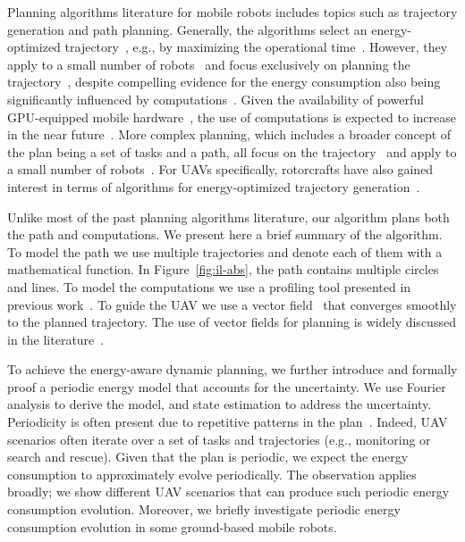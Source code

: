 \documentclass[letterpaper,10pt,conference]{ieeeconf}
\theoremstyle{definition}
\begin{document}
Planning algorithms literature for mobile robots includes topics such as trajectory generation and path planning. Generally, the algorithms select an energy-optimized trajectory~\cite{mei2004energy}, e.g., by maximizing the operational time~\cite{wahab2015energy}. However, they apply to a small number of robots~\cite{kim2005energy} and focus exclusively on planning the trajectory~\cite{kim2008minimum}, despite compelling evidence for the energy consumption also being significantly influenced by computations~\cite{mei2005case}. Given the availability of powerful GPU-equipped mobile hardware~\cite{rizvi2017general}, the use of computations is expected to increase in the near future~\cite{abramov2012real,satria2016real,jaramillo2019visual}. More complex planning, which includes a broader concept of the plan being a set of tasks and a path, all focus on the trajectory~\cite{mei2005case,mei2006deployment} and apply to a small number of robots~\cite{sadrpour2013mission,sadrpour2013experimental}. For UAVs specifically, rotorcrafts have also gained interest in terms of algorithms for energy-optimized trajectory generation~\cite{morbidi2016minimum,kreciglowa2017energy}. 

Unlike most of the past planning algorithms literature, our algorithm plans both the path and computations. We present here a brief summary of the algorithm. To model the path we use multiple trajectories and denote each of them with a mathematical function. In Figure~\ref{fig:il-abs}, the path contains multiple circles and lines. To model the computations we use a profiling tool presented in previous work~\cite{seewald2019coarse}. To guide the UAV we use a vector field~\cite{de2017guidance} that converges smoothly to the planned trajectory. The use of vector fields for planning is widely discussed in the literature~\cite{lindemann2005smoothly,gonccalves2010vector,panagou2014motion,zhou2014vector,kapitanyuk2017guiding,de2017guidance}. 

To achieve the energy-aware dynamic planning, we further introduce and formally proof a periodic energy model that accounts for the uncertainty. We use Fourier analysis to derive the model, and state estimation to address the uncertainty. Periodicity is often present due to repetitive patterns in the plan~\cite{seewald2020mechanical}. Indeed, UAV scenarios often iterate over a set of tasks and trajectories (e.g., monitoring or search and rescue). Given that the plan is periodic, we expect the energy consumption to approximately evolve periodically. The observation applies broadly; we show different UAV scenarios that can produce such periodic energy consumption evolution. Moreover, we briefly investigate periodic energy consumption evolution in some ground-based mobile robots.
\end{document}
